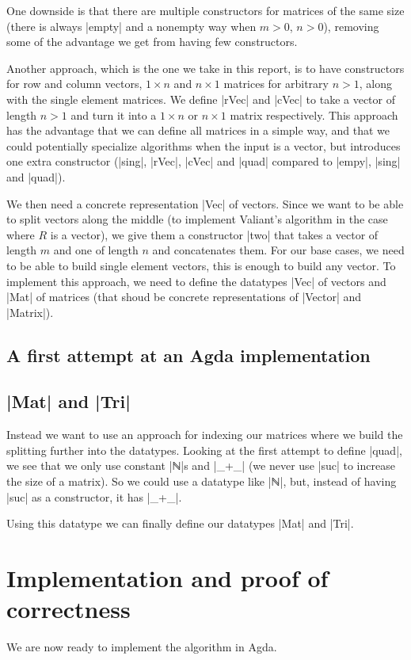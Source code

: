 One downside is that there are multiple constructors for matrices of the same size (there is always |empty| and a nonempty way when $m > 0$, $n > 0$), removing some of the advantage we get from having few constructors.

Another approach, which is the one we take in this report, is to have constructors for row and column vectors, $1 \times n$ and $n \times 1$ matrices for arbitrary $n > 1$, along with the single element matrices. We define |rVec| and |cVec| to take a vector of length $n > 1$ and turn it into a $1 \times n$ or $n \times 1$ matrix respectively.
This approach has the advantage that we can define all matrices in a simple way, and that we could potentially specialize algorithms when the input is a vector, but introduces one extra constructor (|sing|, |rVec|, |cVec| and |quad| compared to |empy|, |sing| and |quad|).

We then need a concrete representation |Vec| of vectors. Since we want to be able to split vectors along the middle (to implement Valiant's algorithm in the case where $R$ is a vector), we give them a constructor |two| that takes a vector of length $m$ and one of length $n$ and concatenates them. For our base cases, we need to be able to build single element vectors, this is enough to build any vector.
To implement this approach, we need to define the datatypes |Vec| of vectors and |Mat| of matrices (that shoud be concrete representations of |Vector| and |Matrix|).
\subsection{A first attempt at an Agda implementation}
\subsection{|Mat| and |Tri|}
Instead we want to use an approach for indexing our matrices where we build the splitting further into the datatypes. Looking at the first attempt to define |quad|, we see that we only use constant |ℕ|s and |_+_| (we never use |suc| to increase the size of a matrix). So we could use a datatype like |ℕ|, but, instead of having |suc| as a constructor, it has |_+_|.

Using this datatype we can finally define our datatypes |Mat| and |Tri|.
\section{Implementation and proof of correctness}
We are now ready to implement the algorithm in Agda.
\label{Implementation}
